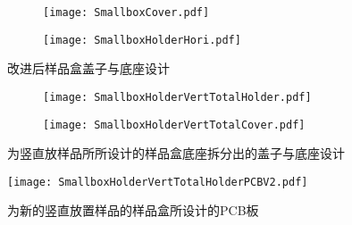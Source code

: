 \begin{figure}[h]
  \centering%
  \begin{subfigure}{0.4\textwidth}
    \texttt{[image: SmallboxCover.pdf]}
  \end{subfigure}%
  \hfill
  \begin{subfigure}{0.4\textwidth}
    \texttt{[image: SmallboxHolderHori.pdf]}
  \end{subfigure}
  \caption{改进后样品盒盖子与底座设计}
  \label{fig:newSampleBox}
\end{figure}











\begin{figure}[h]
  \centering%
  \begin{subfigure}{0.4\textwidth}
    \texttt{[image: SmallboxHolderVertTotalHolder.pdf]}
  \end{subfigure}%
  \hfill
  \begin{subfigure}{0.4\textwidth}
    \texttt{[image: SmallboxHolderVertTotalCover.pdf]}
  \end{subfigure}
  \caption{为竖直放样品所所设计的样品盒底座拆分出的盖子与底座设计}
  \label{fig:newVertiSampleBox}
\end{figure}

                  


\begin{figure}[h]
  \centering%
  \texttt{[image: SmallboxHolderVertTotalHolderPCBV2.pdf]}
  \caption{为新的竖直放置样品的样品盒所设计的PCB板}
  \label{fig:SmallboxHolderVertTotalHolderPCBV2}
\end{figure}








